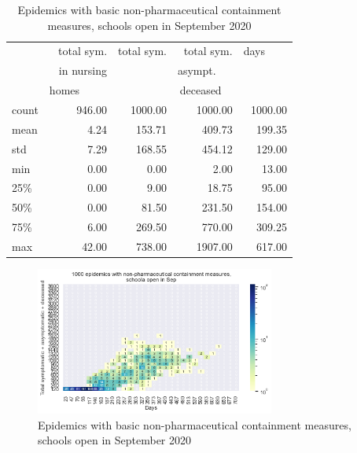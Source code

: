 \documentclass[11pt]{article}
\begin{document}
\begin{table}[H]
\center
\small
\begin{tabular}{lrrrr}
\toprule
{} & total sym.        &  total sym. & total sym.     & days~~~~ \\
{} & in nursing        &                  & asympt.~~~  & \\
{} & homes~~~~~  &                  & deceased~~ & \\
\midrule
count &     946.00 &             1000.00 &                 1000.00 & 1000.00 \\
mean  &       4.24 &              153.71 &                  409.73 &  199.35 \\
std   &       7.29 &              168.55 &                  454.12 &  129.00 \\
min   &       0.00 &                0.00 &                    2.00 &   13.00 \\
25\%   &       0.00 &                9.00 &                   18.75 &   95.00 \\
50\%   &       0.00 &               81.50 &                  231.50 &  154.00 \\
75\%   &       6.00 &              269.50 &                  770.00 &  309.25 \\
max   &      42.00 &              738.00 &                 1907.00 &  617.00 \\
\bottomrule
\end{tabular}

\label{EpidemicsWithAndSchoolT}
\caption{Epidemics with basic non-pharmaceutical containment measures, schools open in September 2020}
\end{table}


\begin{figure}[H]
\begin{center}
\includegraphics[width=0.7\textwidth]{HM30_readRunResults1k_basicControl_schoolOpenSept_plusHMlog.png}
\caption{Epidemics with basic non-pharmaceutical containment measures, schools open in September 2020}
\label{EpidemicsWithAndSchoolHM}
\end{center}
\end{figure}
\end{document}
